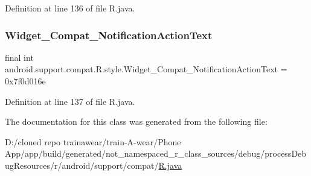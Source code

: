 Definition at line 136 of file R.\+java.

\mbox{\label{classandroid_1_1support_1_1compat_1_1_r_1_1style_a96ff4cd097ce36adea6f4badafde3416}} 
\subsubsection{\texorpdfstring{Widget\_Compat\_NotificationActionText}{Widget\_Compat\_NotificationActionText}}
{\footnotesize\ttfamily final int android.\+support.\+compat.\+R.\+style.\+Widget\+\_\+\+Compat\+\_\+\+Notification\+Action\+Text = 0x7f0d016e\hspace{0.3cm}{\ttfamily [static]}}



Definition at line 137 of file R.\+java.



The documentation for this class was generated from the following file\+:\begin{DoxyCompactItemize}
\item 
D\+:/cloned repo trainawear/train-\/\+A-\/wear/\+Phone App/app/build/generated/not\+\_\+namespaced\+\_\+r\+\_\+class\+\_\+sources/debug/process\+Debug\+Resources/r/android/support/compat/\mbox{\hyperlink{process_debug_resources_2r_2android_2support_2compat_2_r_8java}{R.\+java}}\end{DoxyCompactItemize}
